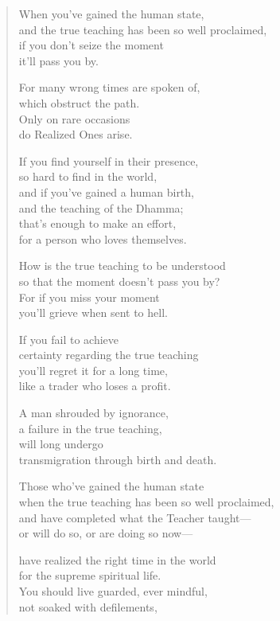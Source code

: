 \documentclass[12pt,openany]{book}%
\begin{document}
\begin{verse}%
When you’ve gained the human state, \\
and the true teaching has been so well proclaimed, \\
if you don’t seize the moment \\
it’ll pass you by. 

For many wrong times are spoken of, \\
which obstruct the path. \\
Only on rare occasions \\
do Realized Ones arise. 

If you find yourself in their presence, \\
so hard to find in the world, \\
and if you’ve gained a human birth, \\
and the teaching of the Dhamma; \\
that’s enough to make an effort, \\
for a person who loves themselves. 

How is the true teaching to be understood \\
so that the moment doesn’t pass you by? \\
For if you miss your moment \\
you’ll grieve when sent to hell. 

If you fail to achieve \\
certainty regarding the true teaching \\
you’ll regret it for a long time, \\
like a trader who loses a profit. 

A man shrouded by ignorance, \\
a failure in the true teaching, \\
will long undergo \\
transmigration through birth and death. 

Those who’ve gained the human state \\
when the true teaching has been so well proclaimed, \\
and have completed what the Teacher taught—\\
or will do so, or are doing so now—

have realized the right time in the world \\
for the supreme spiritual life. \\
You should live guarded, ever mindful, \\
not soaked with defilements, 


\end{verse}
\end{document}
